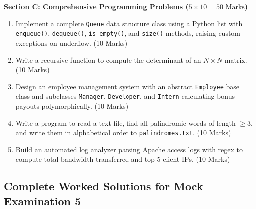 \begin{mockexam}
\medskip
\noindent\textbf{Section C: Comprehensive Programming Problems ($5 \times 10 = 50\text{ Marks}$)}
\begin{enumerate}[leftmargin=1.5em, start=17]
    \item Implement a complete \texttt{Queue} data structure class using a Python list with \texttt{enqueue()}, \texttt{dequeue()}, \texttt{is\_empty()}, and \texttt{size()} methods, raising custom exceptions on underflow. (10 Marks)
    \item Write a recursive function to compute the determinant of an $N \times N$ matrix. (10 Marks)
    \item Design an employee management system with an abstract \texttt{Employee} base class and subclasses \texttt{Manager}, \texttt{Developer}, and \texttt{Intern} calculating bonus payouts polymorphically. (10 Marks)
    \item Write a program to read a text file, find all palindromic words of length $\ge 3$, and write them in alphabetical order to \texttt{palindromes.txt}. (10 Marks)
    \item Build an automated log analyzer parsing Apache access logs with regex to compute total bandwidth transferred and top 5 client IPs. (10 Marks)
\end{enumerate}
\end{mockexam}

\subsection{Complete Worked Solutions for Mock Examination 5}

